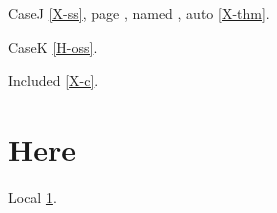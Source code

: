 \documentclass{article}
\begin{document}
CaseJ \ref{X-ss}, page \pageref{X-front}, named ,
auto \autoref{X-thm}.

CaseK \ref{H-oss}.

Included \ref{X-c}.

\section{Here}\label{here}
Local \ref{here}.
\end{document}
